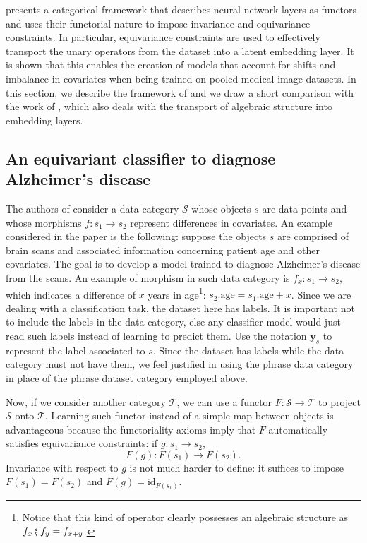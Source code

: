 \documentclass[11pt,a4paper,openright,twoside]{report}
\theoremstyle{plain}
\theoremstyle{definition}
\begin{document}
\cite{chytas2024poolingimagedatasetsmultiple} presents a categorical framework that describes neural network layers as functors and uses their functorial nature to impose invariance and equivariance constraints. In particular, equivariance constraints are used to effectively transport the unary operators from the dataset into a latent embedding layer. It is shown that this enables the creation of models that account for shifts and imbalance in covariates when being trained on pooled medical image datasets. In this section, we describe the framework of \cite{chytas2024poolingimagedatasetsmultiple} and we draw a short comparison with the work of \cite{pfrommer2024transport}, which also deals with the transport of algebraic structure into embedding layers.


\subsection{An equivariant classifier to diagnose Alzheimer's disease}

The authors of \cite{chytas2024poolingimagedatasetsmultiple} consider a data category $\mathcal{S}$ whose objects $s$ are data points and whose morphisms $f: s_1 \to s_2$ represent differences in covariates. An example considered in the paper is the following: suppose the objects $s$ are comprised of brain scans and associated information concerning patient age and other covariates. The goal is to develop a model trained to diagnose Alzheimer's disease from the scans. An example of morphism in such data category is $f_x: s_1 \to s_2$, which indicates a difference of $x$ years in age\footnote{Notice that this kind of operator clearly possesses an algebraic structure as $f_x \fatsemi f_y = f_{x+y}$.}: $s_2.\mathrm{age} = s_1.\mathrm{age} + x$. Since we are dealing with a classification task, the dataset here has labels. It is important not to include the labels in the data category, else any classifier model would just read such labels instead of learning to predict them. Use the notation $\mathbf{y}_s$ to represent the label associated to $s$. Since the dataset has labels while the data category must not have them, we feel justified in using the phrase data category in place of the phrase dataset category employed above.

Now, if we consider another category $\mathcal{T}$, we can use a functor $F: \mathcal{S} \to \mathcal{T}$ to project $\mathcal{S}$ onto $\mathcal{T}$. Learning such functor instead of a simple map between objects is advantageous because the functoriality axioms imply that $F$ automatically satisfies equivariance constraints: if $g: s_1 \to s_2$,
\begin{equation}
  \label{eq: categorical_equivariance}
  F(g): F(s_1) \to F(s_2).
\end{equation}
Invariance with respect to $g$ is not much harder to define: it suffices to impose $F(s_1) = F(s_2)$ and $F(g) = \mathrm{id}_{F(s_1)}$.
\end{document}
